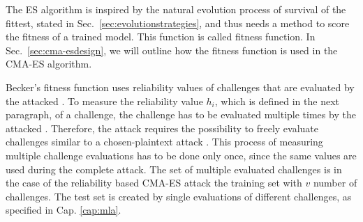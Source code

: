The \ac{ES} algorithm is inspired by the natural evolution process of survival of the fittest, stated in Sec.\ \ref{sec:evolutionstrategies}, and thus needs a method to score the fitness of a trained model.
This function is called fitness function.
In Sec.\ \ref{sec:cma-esdesign}, we will outline how the fitness function is used in the \ac{CMA-ES} algorithm.


Becker's fitness function uses reliability values of challenges that are evaluated by the attacked \puf.
To measure the reliability value $h_i$, which is defined in the next paragraph, of a challenge, the challenge has to be evaluated multiple times by the attacked \puf.
Therefore, the attack requires the possibility to freely evaluate challenges similar to a chosen-plaintext attack \cite{IETF2000InternetGlossary}.
This process of measuring multiple challenge evaluations has to be done only once, since the same values are used during the complete attack. %
The set of multiple evaluated challenges is in the case of the reliability based \ac{CMA-ES} attack the training set with $v$ number of challenges.
The test set is created by single evaluations of different challenges, as specified in Cap. \ref{cap:mla}.




